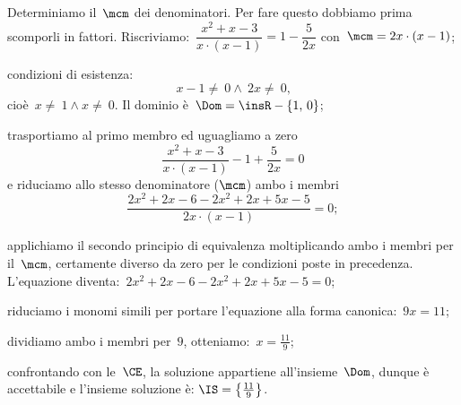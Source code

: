 \begin{exrig}
\begin{enumeratea}
 \item Determiniamo il~$\mcm$ dei denominatori. Per fare questo dobbiamo prima scomporli in fattori.
    Riscriviamo:~$\dfrac{x^{2}+x-3}{x\cdot (x-1)}=1-\dfrac{5}{2x}$ con~$\mcm=2x\cdot (x-1)$;
 \item condizioni di esistenza: \[x-1\neq~0\wedge~2x\neq~0\text{,}\] cioè~$x\neq~1\wedge x\neq~0$. Il dominio è~$\Dom=\insR-\{1\text{,~}0\}$;
 \item trasportiamo al primo membro ed uguagliamo a zero \[\frac{x^{2}+x-3}{x\cdot (x-1)}-1+\frac{5}{2x}=0\]
    e riduciamo allo stesso denominatore ($\mcm$) ambo i membri \[\frac{2x^{2}+2x-6-2x^{2}+2x+5x-5}{2x\cdot (x-1)}=0;\]
 \item applichiamo il secondo principio di equivalenza moltiplicando ambo i membri per il~$\mcm$,
    certamente diverso da zero per le condizioni poste in precedenza. L'equazione diventa:~$2x^{2}+2x-6-2x^{2}+2x+5x-5=0$;
 \item riduciamo i monomi simili per portare l'equazione alla forma canonica:~$9x=11$;
 \item dividiamo ambo i membri per~$9$, otteniamo:~$x=\frac{11}{9}$;
 \item confrontando con le~$\CE$, la soluzione appartiene all'insieme~$\Dom$, dunque è accettabile e l'insieme soluzione è:
    $\IS=\left\{\frac{11}{9}\right\}$.
\end{enumeratea}

\end{exrig}

\ovalbox{\risolvii \ref{ese:18.1}, \ref{ese:18.2}, \ref{ese:18.3}, \ref{ese:18.4}, \ref{ese:18.5}, \ref{ese:18.6}, \ref{ese:18.7},
\ref{ese:18.8}, \ref{ese:18.9}, \ref{ese:18.10}, \ref{ese:18.11}}

\vspazio\ovalbox{\ref{ese:18.12}, \ref{ese:18.13}, \ref{ese:18.14}, \ref{ese:18.15}, \ref{ese:18.16}, \ref{ese:18.17}, \ref{ese:18.18}, \ref{ese:18.19}}

\newpage

\cleardoublepage

